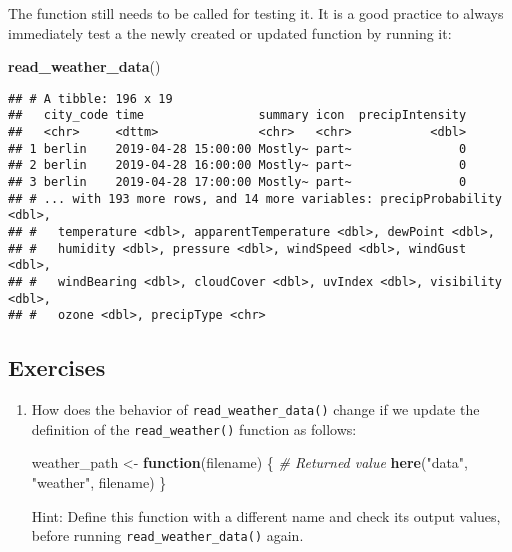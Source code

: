 \documentclass[]{book}
\newenvironment{Shaded}{\begin{snugshade}}{\end{snugshade}}
\newcommand{\CommentTok}[1]{\textcolor[rgb]{0.56,0.35,0.01}{\textit{#1}}}
\newcommand{\ControlFlowTok}[1]{\textcolor[rgb]{0.13,0.29,0.53}{\textbf{#1}}}
\newcommand{\KeywordTok}[1]{\textcolor[rgb]{0.13,0.29,0.53}{\textbf{#1}}}
\newcommand{\NormalTok}[1]{#1}
\newcommand{\StringTok}[1]{\textcolor[rgb]{0.31,0.60,0.02}{#1}}
\begin{document}
The function still needs to be called for testing it.
It is a good practice to always immediately test a the newly created or updated function by running it:

\begin{Shaded}
\begin{Highlighting}[]
\KeywordTok{read_weather_data}\NormalTok{()}
\end{Highlighting}
\end{Shaded}

\begin{verbatim}
## # A tibble: 196 x 19
##   city_code time                summary icon  precipIntensity
##   <chr>     <dttm>              <chr>   <chr>           <dbl>
## 1 berlin    2019-04-28 15:00:00 Mostly~ part~               0
## 2 berlin    2019-04-28 16:00:00 Mostly~ part~               0
## 3 berlin    2019-04-28 17:00:00 Mostly~ part~               0
## # ... with 193 more rows, and 14 more variables: precipProbability <dbl>,
## #   temperature <dbl>, apparentTemperature <dbl>, dewPoint <dbl>,
## #   humidity <dbl>, pressure <dbl>, windSpeed <dbl>, windGust <dbl>,
## #   windBearing <dbl>, cloudCover <dbl>, uvIndex <dbl>, visibility <dbl>,
## #   ozone <dbl>, precipType <chr>
\end{verbatim}

\hypertarget{exercises-1}{%
\subsection{Exercises}\label{exercises-1}}

\begin{enumerate}
\def\labelenumi{\arabic{enumi}.}
\item
  How does the behavior of \texttt{read\_weather\_data()} change if we update the definition of the \texttt{read\_weather()} function as follows:

\begin{Shaded}
\begin{Highlighting}[]
\NormalTok{weather_path <-}\StringTok{ }\ControlFlowTok{function}\NormalTok{(filename) \{}
  \CommentTok{# Returned value}
  \KeywordTok{here}\NormalTok{(}\StringTok{"data"}\NormalTok{, }\StringTok{"weather"}\NormalTok{, filename)}
\NormalTok{\}}
\end{Highlighting}
\end{Shaded}

  Hint: Define this function with a different name and check its output values, before running \texttt{read\_weather\_data()} again.
\end{enumerate}
\end{document}
